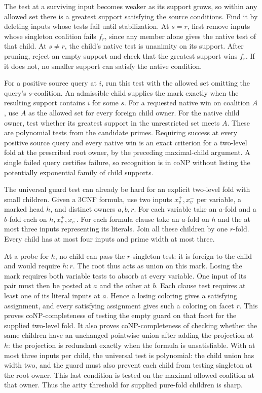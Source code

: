 The test at a surviving input becomes weaker as its support
grows, so within any allowed set there is a greatest support
satisfying the source conditions. Find it by deleting inputs
whose tests fail until stabilization. At $s=r$, first remove
inputs whose singleton coalition fails $f_r$, since any
member alone gives the native test of that child. At $s\ne r$,
the child's native test is unanimity on its support. After
pruning, reject an empty support and check that the greatest
support wins $f_r$. If it
does not, no smaller support can satisfy the native condition.

For a positive source query at $i$, run this test with the
allowed set omitting the query's $s$-coalition. An admissible
child supplies the mark exactly when the resulting support
contains $i$ for some $s$. For a requested native win on
coalition $A$, use $A$ as the allowed set for every foreign
child owner. For the native child owner, test whether its
greatest support in the unrestricted set meets $A$. These
are polynomial tests from the candidate primes. Requiring
success at every positive source query and every native win
is an exact criterion for a two-level fold at the prescribed
root owner, by the preceding maximal-child argument. A single
failed query certifies failure, so recognition is in coNP
without listing the potentially exponential family of child
supports.

The universal guard test can already be hard for an explicit
two-level fold with small children. Given a 3CNF formula,
use two inputs $x_v^+,x_v^-$ per variable, a marked head $h$,
and distinct owners $a,b,r$. For each variable take an
$a$-fold and a $b$-fold each on $h,x_v^+,x_v^-$. For each
formula clause take an $a$-fold on $h$ and the at most three
inputs representing its literals. Join all these children
by one $r$-fold. Every child has at most four inputs and
prime width at most three.

At a probe for $h$, no child can pass the $r$-singleton test:
it is foreign to the child and would require $h:r$. The root
thus acts as union on this mark. Losing the mark requires
both variable tests to absorb at every variable. One input
of its pair must then be posted at $a$ and the other at $b$.
Each clause test requires at least one of its literal inputs
at $a$. Hence a losing coloring gives a satisfying assignment,
and every satisfying assignment gives such a coloring on
facet $r$. This proves coNP-completeness of testing the empty
guard on that facet for the supplied two-level fold. It also
proves coNP-completeness of checking whether the same children
have an unchanged pointwise union after adding the projection
at $h$: the projection is redundant exactly when the formula
is unsatisfiable. With at most three inputs per child, the
universal test is polynomial: the child union has width two,
and the guard must also prevent each child from testing
singleton at the root owner. This last condition is tested on
the maximal allowed coalition at that owner. Thus the arity
threshold for supplied pure-fold children is sharp.


